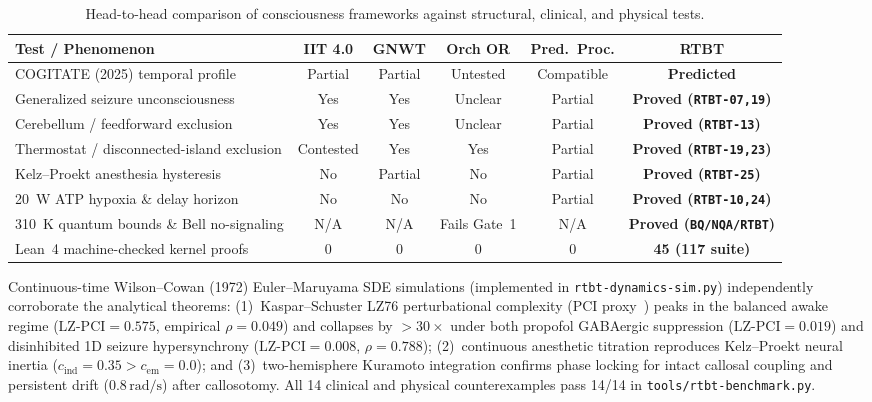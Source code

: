 \documentclass[11pt,letterpaper]{article}
\newcommand{\code}[1]{\texttt{\small #1}}
\begin{document}
\begin{table}[t]
\centering
\scriptsize
\setlength{\tabcolsep}{3.5pt}
\renewcommand{\arraystretch}{1.08}
\begin{tabular}{@{}l c c c c c@{}}
\toprule
\textbf{Test / Phenomenon} & \textbf{IIT 4.0} & \textbf{GNWT} & \textbf{Orch OR} & \textbf{Pred.\ Proc.} & \textbf{RTBT} \\
\midrule
COGITATE (2025) temporal profile & Partial & Partial & Untested & Compatible & \textbf{Predicted} \\
Generalized seizure unconsciousness & Yes & Yes & Unclear & Partial & \textbf{Proved (\code{RTBT-07,19})} \\
Cerebellum / feedforward exclusion & Yes & Yes & Unclear & Partial & \textbf{Proved (\code{RTBT-13})} \\
Thermostat / disconnected-island exclusion & Contested & Yes & Yes & Partial & \textbf{Proved (\code{RTBT-19,23})} \\
Kelz--Proekt anesthesia hysteresis & No & Partial & No & Partial & \textbf{Proved (\code{RTBT-25})} \\
20~W ATP hypoxia \& delay horizon & No & No & No & Partial & \textbf{Proved (\code{RTBT-10,24})} \\
310~K quantum bounds \& Bell no-signaling & N/A & N/A & Fails Gate~1 & N/A & \textbf{Proved (\code{BQ/NQA/RTBT})} \\
Lean~4 machine-checked kernel proofs & 0 & 0 & 0 & 0 & \textbf{45 (117 suite)} \\
\bottomrule
\end{tabular}
\caption{Head-to-head comparison of consciousness frameworks against structural, clinical, and physical tests.}
\label{tab:compare}
\end{table}

Continuous-time Wilson--Cowan (1972) Euler--Maruyama SDE simulations (implemented in \code{rtbt-dynamics-sim.py}) independently corroborate the analytical theorems: (1)~Kaspar--Schuster LZ76 perturbational complexity (PCI proxy~\cite{Casali2013}) peaks in the balanced awake regime ($\mathrm{LZ\text{-}PCI} = 0.575$, empirical $\rho = 0.049$) and collapses by $>30\times$ under both propofol GABAergic suppression ($\mathrm{LZ\text{-}PCI} = 0.019$) and disinhibited 1D seizure hypersynchrony ($\mathrm{LZ\text{-}PCI} = 0.008$, $\rho = 0.788$); (2)~continuous anesthetic titration reproduces Kelz--Proekt neural inertia ($c_{\mathrm{ind}} = 0.35 > c_{\mathrm{em}} = 0.0$); and (3)~two-hemisphere Kuramoto integration confirms phase locking for intact callosal coupling and persistent drift ($0.8\,\mathrm{rad/s}$) after callosotomy. All 14 clinical and physical counterexamples pass 14/14 in \code{tools/rtbt-benchmark.py}.
\end{document}
